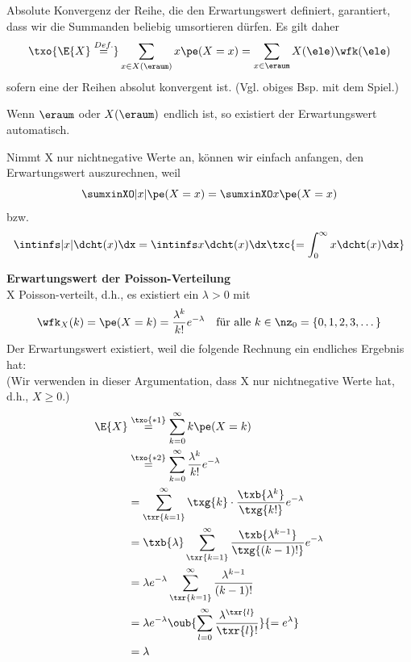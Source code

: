 \begin{bem} 
    Absolute Konvergenz der Reihe, die den Erwartungswert definiert, garantiert,
    dass wir die Summanden beliebig umsortieren dürfen.
    Es gilt daher
    \[
        \txo{\E{X} \overset{Def.}{=}} \sum_{x\in X(\eraum)} x \pe(X=x) = \sum_{x\in \eraum} X(\ele) \wfk(\ele)
    \]
    sofern eine der Reihen absolut konvergent ist.
    (Vgl.
    obiges Bsp.
    mit dem Spiel.)

    Wenn $\eraum$ oder $X(\eraum)$ endlich ist, so existiert der Erwartungswert automatisch.

    Nimmt X nur nichtnegative Werte an, können wir einfach anfangen, den
    Erwartungswert auszurechnen, weil
    \[
        \sumxinXO  |x| \pe(X=x) = \sumxinXO x \pe(X=x)
    \]
    bzw.
    \[
        \intinfs |x| \dcht (x) \dx = \intinfs x \dcht (x) \dx \txc{ = \int^{\infty}_0 x \dcht (x) \dx }
    \]
\end{bem}

\begin{bsp}
    \textbf{Erwartungswert der Poisson-Verteilung}   \\
    X Poisson-verteilt, d.h., es existiert ein $\lambda > 0$ mit
    \[
        \wfk_X(k) = \pe (X=k) = \frac{\lambda^k}{k!} e^{-\lambda} \quad \text{für alle } k \in \nz_0 = \{0, 1, 2, 3, \dots \}
    \]
    Der Erwartungswert existiert, weil die folgende Rechnung ein endliches Ergebnis hat: \\
    (Wir verwenden in dieser Argumentation, dass X nur nichtnegative Werte hat, d.h., $X \geq 0$.)
    \begin{align*}
        \E{X} & \overset{\txo{*1}}{=} \sum^{\infty}_{k=0} k \pe(X=k) \\
        & \overset{\txo{*2}}{=}  \sum^{\infty}_{k=0} \frac{\lambda^k}{k!} e^{-\lambda} \\
        & = \sum^{\infty}_{\txr{k=1}} \txg{k} \cdot \frac{\txb{\lambda^k}}{\txg{k!}} e^{-\lambda} \\
        & = \txb{\lambda}   \sum^{\infty}_{\txr{k=1}}  \frac{\txb{\lambda^{k-1}}}{\txg{(k-1)!}} e^{-\lambda} \\
        & = \lambda e^{-\lambda} \sum^{\infty}_{\txr{k=1}}  \frac{\lambda^{k-1}}{(k-1)!} \\
        & = \lambda e^{-\lambda}
        \oub{
            \sum_{l=0}^{\infty}
            \frac{\lambda^{\txr{l}}}{\txr{l}!}
        }{=e^{\lambda}} \\
        & = \lambda
    \end{align*}
\end{bsp}

